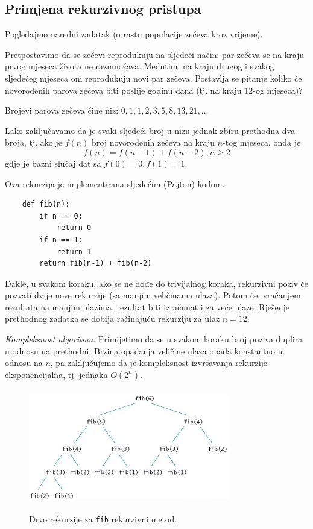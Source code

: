 \subsection{Primjena rekurzivnog pristupa  }

Pogledajmo naredni zadatak (o rastu populacije zečeva kroz vrijeme). 
\begin{example}
  
	Pretpostavimo da se zečevi reprodukuju na sljedeći način: par zečeva se na kraju prvog mjeseca života ne razmnožava. Međutim, na kraju drugog i svakog sljedećeg mjeseca oni reprodukuju novi par zečeva. Postavlja se pitanje koliko će novorođenih parova zečeva biti poslije godinu dana (tj. na kraju 12-og mjeseca)?
\end{example}

\begin{solution}
	 
	
	Brojevi parova zečeva čine niz: $0, 1,1, 2,3,5,8,13, 21, \ldots$ 
	
	Lako zaključavamo da je svaki sljedeći broj u nizu jednak zbiru prethodna dva broja, tj. ako je $f(n)$ broj  novorođenih zečeva na kraju $n$-tog mjeseca, onda je 
	$$f(n) = f(n-1) + f(n-2), n \geq 2$$
	gdje je bazni slučaj dat sa $f(0)= 0, f(1) = 1$.
\end{solution}

Ova rekurzija je implementirana sljedećim (Pajton) kodom.

\begin{verbatim}
	def fib(n):
		if n == 0:
			return 0
		if n == 1:
			return 1
		return fib(n-1) + fib(n-2)
\end{verbatim}

Dakle, u svakom koraku, ako se ne dođe do trivijalnog koraka, rekurzivni poziv će pozvati dvije nove rekurzije (sa manjim veličinama ulaza). Potom će, vraćanjem rezultata na manjim ulazima, rezultat biti izračunat i za veće ulaze. Rješenje prethodnog zadatka se dobija račinajuću rekurziju za ulaz $n=12$. 

\textit{Kompleksnost algoritma}. Primijetimo da se u svakom koraku broj poziva duplira u odnosu na prethodni. Brzina opadanja veličine ulaza opada konstantno u odnosu na $n$, pa zaključujemo da je kompleksnost izvršavanja rekurzije eksponencijalna, tj. jednaka $O(2^n)$.

\begin{figure}[H]
	\centering
	\includegraphics[width=250pt,height=140pt]{slike/fib_rec.jpeg} 
	\label{fig:rec_fib}
	\caption{Drvo rekurzije za \texttt{fib} rekurzivni metod.}
\end{figure}




